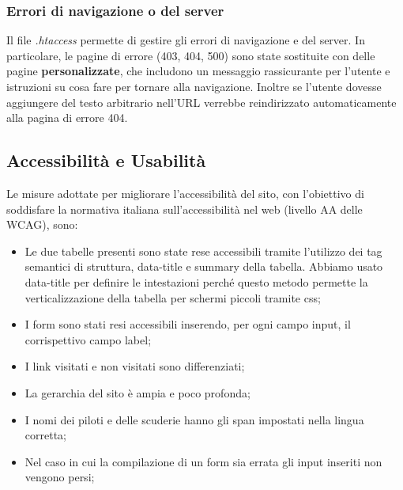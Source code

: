 \documentclass[11pt,a4paper]{article}
\begin{document}
\subsubsection{Errori di navigazione o del server}
Il file \textit{.htaccess} permette di gestire gli errori di navigazione e del server. In particolare, le pagine di errore (403, 404, 500) sono state sostituite con delle pagine \textbf{personalizzate}, che includono un messaggio rassicurante per l'utente e istruzioni su cosa fare per tornare alla navigazione. Inoltre se l'utente dovesse aggiungere del testo arbitrario nell'URL verrebbe reindirizzato automaticamente alla pagina di errore 404.
\subsection{Accessibilità e Usabilità}
Le misure adottate per migliorare l'accessibilità del sito, con l'obiettivo di soddisfare la normativa italiana sull'accessibilità nel web (livello AA delle WCAG), sono:
\begin{itemize}
    \item Le due tabelle presenti sono state rese accessibili tramite l'utilizzo dei tag semantici di struttura, data-title e summary della tabella.
    Abbiamo usato data-title per definire le intestazioni perché questo metodo permette la verticalizzazione della tabella per schermi piccoli tramite css;
    \item I form sono stati resi accessibili inserendo, per ogni campo input, il corrispettivo campo label;
    \item I link visitati e non visitati sono differenziati;
    \item La gerarchia del sito è ampia e poco profonda;
    \item I nomi dei piloti e delle scuderie hanno gli span impostati nella lingua corretta;
    \item Nel caso in cui la compilazione di un form sia errata gli input inseriti non vengono persi;
\end{itemize}
\end{document}
